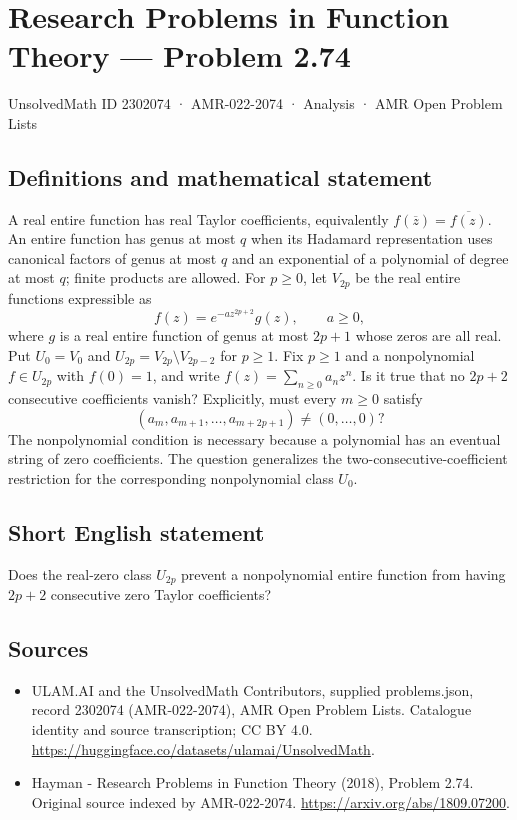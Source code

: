 \documentclass[11pt,a4paper]{article}
\begin{document}
\section*{Research Problems in Function Theory — Problem 2.74}\label{2302074}
{\small UnsolvedMath ID 2302074 · AMR-022-2074 · Analysis · AMR Open Problem Lists}
\subsection{Definitions and mathematical statement}
A real entire function has real Taylor coefficients, equivalently $f(\overline z)=\overline{f(z)}$. An entire function has genus at most $q$ when its Hadamard representation uses canonical factors of genus at most $q$ and an exponential of a polynomial of degree at most $q$; finite products are allowed.
For $p\ge0$, let $V_{2p}$ be the real entire functions expressible as
\[
f(z)=e^{-az^{2p+2}}g(z),\qquad a\ge0,
\]
where $g$ is a real entire function of genus at most $2p+1$ whose zeros are all real. Put $U_0=V_0$ and $U_{2p}=V_{2p}\setminus V_{2p-2}$ for $p\ge1$.
Fix $p\ge1$ and a nonpolynomial $f\in U_{2p}$ with $f(0)=1$, and write $f(z)=\sum_{n\ge0}a_nz^n$. Is it true that no $2p+2$ consecutive coefficients vanish? Explicitly, must every $m\ge0$ satisfy
\[
(a_m,a_{m+1},\ldots,a_{m+2p+1})\ne(0,\ldots,0)?
\]
The nonpolynomial condition is necessary because a polynomial has an eventual string of zero coefficients. The question generalizes the two-consecutive-coefficient restriction for the corresponding nonpolynomial class $U_0$.
\subsection{Short English statement}
Does the real-zero class $U_{2p}$ prevent a nonpolynomial entire function from having $2p+2$ consecutive zero Taylor coefficients?
\subsection{Sources}
\begin{itemize}
\item[S1] ULAM.AI and the UnsolvedMath Contributors, supplied problems.json, record 2302074 (AMR-022-2074), AMR Open Problem Lists. Catalogue identity and source transcription; CC BY 4.0.
\url{https://huggingface.co/datasets/ulamai/UnsolvedMath}.
\item[S2] Hayman - Research Problems in Function Theory (2018), Problem 2.74. Original source indexed by AMR-022-2074.
\url{https://arxiv.org/abs/1809.07200}.
\end{itemize}
\end{document}
